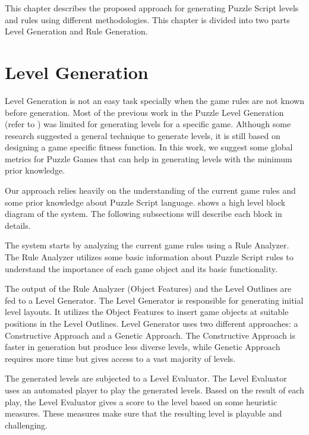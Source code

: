 This chapter describes the proposed approach for generating Puzzle Script levels and rules using different methodologies. This chapter is divided into two parts Level Generation and Rule Generation.

\section{Level Generation}
Level Generation is not an easy task specially when the game rules are not known before generation. Most of the previous work in the Puzzle Level Generation (refer to ) was limited for generating levels for a specific game. Although some research suggested a general technique to generate levels, it is still based on designing a game specific fitness function. In this work, we suggest some global metrics for Puzzle Games that can help in generating levels with the minimum prior knowledge.\\\par

Our approach relies heavily on the understanding of the current game rules and some prior knowledge about Puzzle Script language.  shows a high level block diagram of the system. The following subsections will describe each block in details.


The system starts by analyzing the current game rules using a Rule Analyzer. The Rule Analyzer utilizes some basic information about Puzzle Script rules to understand the importance of each game object and its basic functionality.\\\par

The output of the Rule Analyzer (Object Features) and the Level Outlines are fed to a Level Generator. The Level Generator is responsible for generating initial level layouts. It utilizes the Object Features to insert game objects at suitable positions in the Level Outlines. Level Generator uses two different approaches: a Constructive Approach and a Genetic Approach. The Constructive Approach is faster in generation but produce less diverse levels, while Genetic Approach requires more time but gives access to a vast majority of levels.\\\par

The generated levels are subjected to a Level Evaluator. The Level Evaluator uses an automated player to play the generated levels. Based on the result of each play, the Level Evaluator gives a score to the level based on some heuristic measures. These measures make sure that the resulting level is playable and challenging.\\\par

